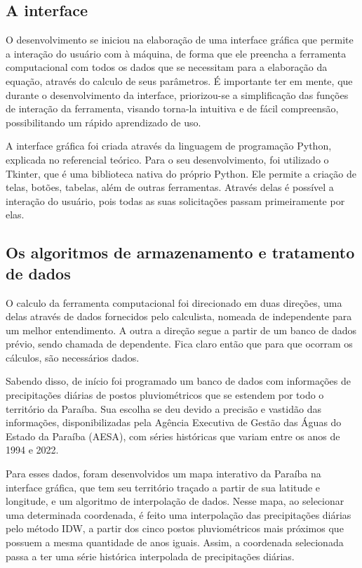 \subsection{A interface}

O desenvolvimento se iniciou na elaboração de uma interface gráfica que permite a interação do usuário com à máquina, de forma que ele preencha a ferramenta computacional com todos os dados que se necessitam para a elaboração da equação, através do calculo de seus parâmetros. É importante ter em mente, que durante o desenvolvimento da interface, priorizou-se a simplificação das funções de interação da ferramenta, visando torna-la intuitiva e de fácil compreensão, possibilitando um rápido aprendizado de uso.

A interface gráfica foi criada através da linguagem de programação Python, explicada no referencial teórico. Para o seu desenvolvimento, foi utilizado o Tkinter, que é uma biblioteca nativa do próprio Python. Ele permite a criação de telas, botões, tabelas, além de outras ferramentas. Através delas é possível a interação do usuário, pois todas as suas solicitações passam primeiramente por elas.

\subsection{Os algoritmos de armazenamento e tratamento de dados}

O calculo da ferramenta computacional foi direcionado em duas direções, uma delas através de dados fornecidos pelo calculista, nomeada de independente para um melhor entendimento. A outra a direção segue a partir de um banco de dados prévio, sendo chamada de dependente. Fica claro então que para que ocorram os cálculos, são necessários dados.

Sabendo disso, de início foi programado um banco de dados com informações de precipitações diárias de postos pluviométricos que se estendem por todo o território da Paraíba. Sua escolha se deu devido a precisão e vastidão das informações, disponibilizadas pela Agência Executiva de Gestão das Águas do Estado da Paraíba (AESA), com séries históricas que variam entre os anos de 1994 e 2022.

Para esses dados, foram desenvolvidos um mapa interativo da Paraíba na interface gráfica, que tem seu território traçado a partir de sua latitude e longitude, e um algoritmo de interpolação de dados. Nesse mapa, ao selecionar uma determinada coordenada, é feito uma interpolação das precipitações diárias pelo método IDW, a partir dos cinco postos pluviométricos mais próximos que possuem a mesma quantidade de anos iguais. Assim, a coordenada selecionada passa a ter uma série histórica interpolada de precipitações diárias. 

